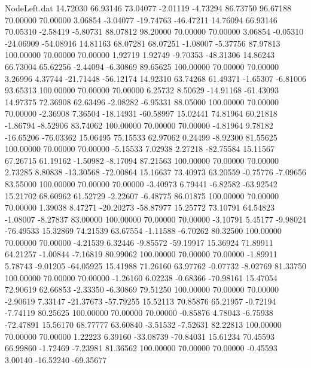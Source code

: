 \begin{filecontents}{NodeLeft.dat}
  14.72030   66.93146   73.04077    -2.01119   -4.73294   86.73750   96.67188   70.00000   70.00000    3.06854   -3.04077  -19.74763  -46.47211
  14.76094   66.93146   70.05310    -2.58419   -5.80731   88.07812   98.20000   70.00000   70.00000    3.06854   -0.05310  -24.06909  -54.08916
  14.81163   68.07281   68.07251    -1.08007   -5.37756   87.97813  100.00000   70.00000   70.00000    1.92719    1.92749   -9.70353  -48.31306
  14.86243   66.73004   65.62256    -2.44094   -6.30869   89.65625  100.00000   70.00000   70.00000    3.26996    4.37744  -21.71448  -56.12174
  14.92310   63.74268   61.49371    -1.65307   -6.81006   93.65313  100.00000   70.00000   70.00000    6.25732    8.50629  -14.91168  -61.43093
  14.97375   72.36908   62.63496    -2.08282   -6.95331   88.05000  100.00000   70.00000   70.00000   -2.36908    7.36504  -18.14931  -60.58997
  15.02441   74.81964   60.21818    -1.86794   -8.52906   83.74062  100.00000   70.00000   70.00000   -4.81964    9.78182  -16.65206  -76.03362
  15.06495   75.15533   62.97062     0.24499   -8.92300   81.55625  100.00000   70.00000   70.00000   -5.15533    7.02938    2.27218  -82.75584
  15.11567   67.26715   61.19162    -1.50982   -8.17094   87.21563  100.00000   70.00000   70.00000    2.73285    8.80838  -13.30568  -72.00864
  15.16637   73.40973   63.20559    -0.75776   -7.09656   83.55000  100.00000   70.00000   70.00000   -3.40973    6.79441   -6.82582  -63.92542
  15.21702   68.60962   61.52729    -2.22607   -6.48775   86.01875  100.00000   70.00000   70.00000    1.39038    8.47271  -20.20273  -58.87977
  15.25772   73.10791   64.54823    -1.08007   -8.27837   83.00000  100.00000   70.00000   70.00000   -3.10791    5.45177   -9.98024  -76.49533
  15.32869   74.21539   63.67554    -1.11588   -6.70262   80.32500  100.00000   70.00000   70.00000   -4.21539    6.32446   -9.85572  -59.19917
  15.36924   71.89911   64.21257    -1.00844   -7.16819   80.99062  100.00000   70.00000   70.00000   -1.89911    5.78743   -9.01205  -64.05925
  15.41988   71.26160   63.97762    -0.07732   -8.02769   81.33750  100.00000   70.00000   70.00000   -1.26160    6.02238   -0.68366  -70.98161
  15.47054   72.90619   62.66853    -2.33350   -6.30869   79.51250  100.00000   70.00000   70.00000   -2.90619    7.33147  -21.37673  -57.79255
  15.52113   70.85876   65.21957    -0.72194   -7.74119   80.25625  100.00000   70.00000   70.00000   -0.85876    4.78043   -6.75938  -72.47891
  15.56170   68.77777   63.60840    -3.51532   -7.52631   82.22813  100.00000   70.00000   70.00000    1.22223    6.39160  -33.08739  -70.84031
  15.61234   70.45593   66.99860    -1.72469   -7.23981   81.36562  100.00000   70.00000   70.00000   -0.45593    3.00140  -16.52240  -69.35677

\end{filecontents}
